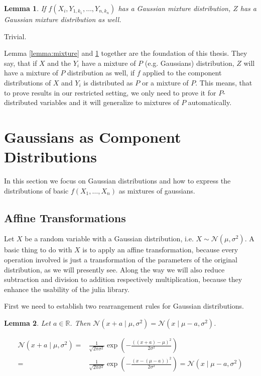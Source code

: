 \documentclass[11pt,a4paper]{book}
\newtheorem{lemma}{Lemma}
\begin{document}
\begin{lemma}
  \label{lemma:components}
  If $f(X_{i}, Y_{1,k_{1}}, \dots, Y_{n,k_{n}})$ has a Gaussian mixture
  distribution, $Z$ has a Gaussian mixture distribution as well.
\end{lemma}
\begin{proof2}
  Trivial.
\end{proof2}

Lemma \ref{lemma:mixture} and \ref{lemma:components} together are the foundation
of this thesis. They say, that if $X$ and the $Y_{i}$ have a mixture of $P$
(e.g. Gaussians) distribution, $Z$ will have a mixture of $P$ distribution as
well, if $f$ applied to the component distributions of $X$ and $Y_{i}$ is
distributed as $P$ or a mixture of $P$. This means, that to prove results in our
restricted setting, we only need to prove it for $P$-distributed variables and
it will generalize to mixtures of $P$ automatically.

\section{Gaussians as Component Distributions}
\label{sec:gaussians}

In this section we focus on Gaussian distributions and how to express the
distributions of basic $f(X_{1}, \dots, X_{n})$ as mixtures of gaussians.

\subsection{Affine Transformations}
\label{sec:affine-transforms}

Let $X$ be a random variable with a Gaussian distribution, i.e.
$X \sim \mathcal{N}(\mu, \sigma^{2})$. A basic thing to do with $X$ is to apply
an affine transformation, because every operation involved is just a
transformation of the parameters of the original distribution, as we will
presently see. Along the way we will also reduce subtraction and division to
addition respectively multiplication, because they enhance the usability of the
julia library.

First we need to establish two rearrangement rules for Gaussian distributions.
\begin{lemma}
  \label{lemma:x-mu-symmetry}
  Let $a \in \mathbb{R}$. Then
  $\mathcal{N}(x + a \mid \mu, \sigma^{2}) = \mathcal{N}(x \mid \mu - a,
  \sigma^{2})$.
\end{lemma}
\begin{proof2}
  \begin{align*}
    \mathcal{N}(x + a \mid \mu, \sigma^{2}) = & \frac{1}{\sqrt{2 \pi \sigma^{2}}} \exp\left( - \frac{\left((x + a) - \mu \right)^{2}}{2\sigma^{2}} \right)\\
    = & \frac{1}{\sqrt{2 \pi \sigma^{2}}} \exp\left( - \frac{\left(x - (\mu - a) \right)^{2}}{2\sigma^{2}} \right) = \mathcal{N}(x \mid \mu - a, \sigma^{2})
  \end{align*}
\end{proof2}
\end{document}
